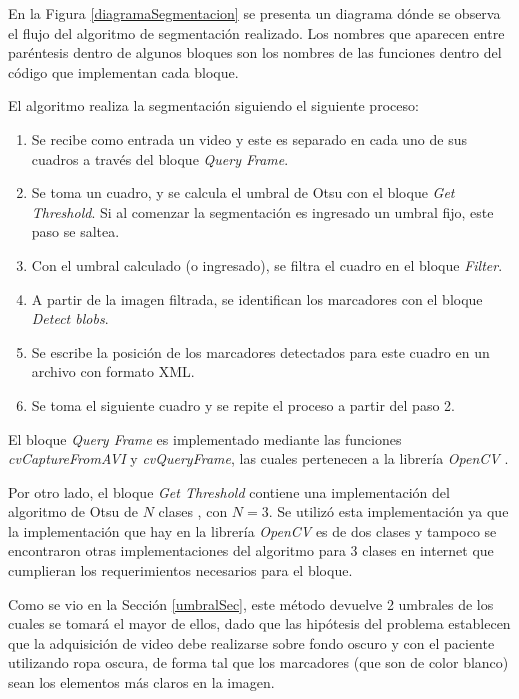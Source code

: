 En la Figura \ref{diagramaSegmentacion} se presenta un diagrama dónde se observa el flujo del algoritmo de segmentación realizado. Los nombres que aparecen entre paréntesis dentro de algunos bloques son los nombres de las funciones dentro del código que implementan cada bloque. 

El algoritmo realiza la segmentación siguiendo el siguiente proceso:

\begin{enumerate}
  \item Se recibe como entrada un video y este es separado en cada uno de sus cuadros a través del bloque \emph{Query Frame}.
  \item Se toma un cuadro, y se calcula el umbral de Otsu con el bloque \emph{Get Threshold}. Si al comenzar la segmentación es ingresado un umbral fijo, este paso se saltea.
  \item Con el umbral calculado (o ingresado), se filtra el cuadro en el bloque \emph{Filter}.
  \item A partir de la imagen filtrada, se identifican los marcadores con el bloque \emph{Detect blobs}.
  \item Se escribe la posición de los marcadores detectados para este cuadro en un archivo con formato XML.
  \item Se toma el siguiente cuadro y se repite el proceso a partir del paso 2.
\end{enumerate}


El bloque \emph{Query Frame} es implementado mediante las funciones \emph{cvCaptureFromAVI} y \emph{cvQueryFrame}, las cuales pertenecen a la librería \emph{OpenCV} \cite{opencv}.


Por otro lado, el bloque \emph{Get Threshold} contiene una implementación del algoritmo de Otsu de $N$ clases \cite{implementacionOtsu}, con $N=3$. Se utilizó esta implementación ya que la implementación que hay en la librería \emph{OpenCV} es de dos clases y tampoco se encontraron otras implementaciones del algoritmo para 3 clases en internet que cumplieran los requerimientos necesarios para el bloque.

 Como se vio en la Sección \ref{umbralSec}, este método devuelve 2 umbrales de los cuales se tomará el mayor de ellos, dado que las hipótesis del problema establecen que la adquisición de video debe realizarse sobre fondo oscuro y con el paciente utilizando ropa oscura, de forma tal que los marcadores (que son de color blanco) sean los elementos más claros en la imagen.

